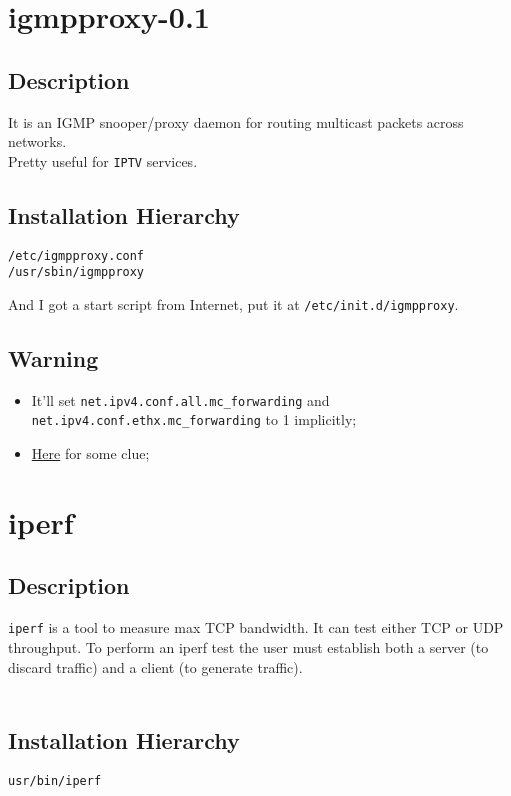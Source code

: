 \documentclass[a4paper]{report}
\begin{document}
\chapter{igmpproxy-0.1}
\section{Description}
It is an IGMP snooper/proxy daemon for routing multicast packets across networks.\\
Pretty useful for {\tt IPTV} services.
\section{Installation Hierarchy}
\begin{lstlisting}
/etc/igmpproxy.conf
/usr/sbin/igmpproxy
\end{lstlisting}
And I got a start script from Internet, put it at {\tt /etc/init.d/igmpproxy}.
\section{Warning}
\begin{itemize}
    \item It'll set {\tt net.ipv4.conf.all.mc\_forwarding} and 
          {\tt net.ipv4.conf.ethx.mc\_forwarding} to 1 implicitly;
    \item \href{http://f0g.is-programmer.com/posts/5458.html}{Here} for some clue;
\end{itemize}


\chapter{iperf}
\label{iperf}
\section{Description}
{\tt iperf} is a tool to measure max TCP bandwidth.
It can test either TCP or UDP throughput.  To perform an iperf test the user must 
establish both a server (to discard traffic) and a client (to generate traffic).\\\\
\section{Installation Hierarchy}
\begin{lstlisting}
usr/bin/iperf
\end{lstlisting}
\end{document}
